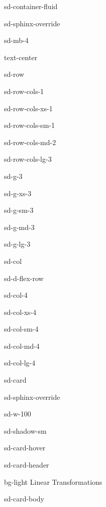 \documentclass[letterpaper,10pt,english]{jupyterBook}
\let\sphinxpxdimen\pdfpxdimen\else\newdimen\sphinxpxdimen
\begin{document}
\begin{sphinxuseclass}{sd-container-fluid}
\begin{sphinxuseclass}{sd-sphinx-override}
\begin{sphinxuseclass}{sd-mb-4}
\begin{sphinxuseclass}{text-center}
\begin{sphinxuseclass}{sd-row}
\begin{sphinxuseclass}{sd-row-cols-1}
\begin{sphinxuseclass}{sd-row-cols-xs-1}
\begin{sphinxuseclass}{sd-row-cols-sm-1}
\begin{sphinxuseclass}{sd-row-cols-md-2}
\begin{sphinxuseclass}{sd-row-cols-lg-3}
\begin{sphinxuseclass}{sd-g-3}
\begin{sphinxuseclass}{sd-g-xs-3}
\begin{sphinxuseclass}{sd-g-sm-3}
\begin{sphinxuseclass}{sd-g-md-3}
\begin{sphinxuseclass}{sd-g-lg-3}
\begin{sphinxuseclass}{sd-col}
\begin{sphinxuseclass}{sd-d-flex-row}
\begin{sphinxuseclass}{sd-col-4}
\begin{sphinxuseclass}{sd-col-xs-4}
\begin{sphinxuseclass}{sd-col-sm-4}
\begin{sphinxuseclass}{sd-col-md-4}
\begin{sphinxuseclass}{sd-col-lg-4}
\begin{sphinxuseclass}{sd-card}
\begin{sphinxuseclass}{sd-sphinx-override}
\begin{sphinxuseclass}{sd-w-100}
\begin{sphinxuseclass}{sd-shadow-sm}
\begin{sphinxuseclass}{sd-card-hover}
\begin{sphinxuseclass}{sd-card-header}
\begin{sphinxuseclass}{bg-light}
\sphinxAtStartPar
Linear Transformations

\end{sphinxuseclass}
\end{sphinxuseclass}
\begin{sphinxuseclass}{sd-card-body}
\begin{figure}[htbp]
\centering

\noindent\sphinxincludegraphics[width=250\sphinxpxdimen]{{6_linear_transformation}.svg}
\end{figure}

\end{sphinxuseclass}{\hyperref[\detokenize{_pages/6.0_Linear_transformations::doc}]{}}
\end{sphinxuseclass}
\end{sphinxuseclass}
\end{sphinxuseclass}
\end{sphinxuseclass}
\end{sphinxuseclass}
\end{sphinxuseclass}
\end{sphinxuseclass}
\end{sphinxuseclass}
\end{sphinxuseclass}
\end{sphinxuseclass}
\end{sphinxuseclass}
\end{sphinxuseclass}
\end{sphinxuseclass}
\end{sphinxuseclass}
\end{sphinxuseclass}
\end{sphinxuseclass}
\end{sphinxuseclass}
\end{sphinxuseclass}
\end{sphinxuseclass}
\end{sphinxuseclass}
\end{sphinxuseclass}
\end{sphinxuseclass}
\end{sphinxuseclass}

\end{sphinxuseclass}
\end{sphinxuseclass}
\end{sphinxuseclass}
\end{sphinxuseclass}
\end{document}

